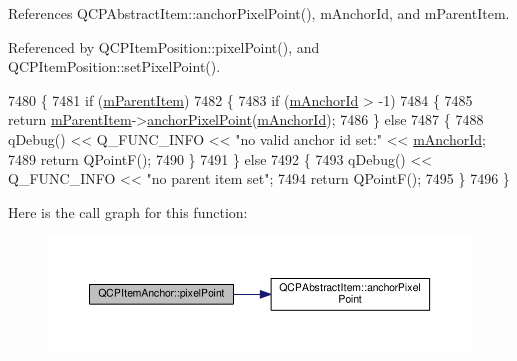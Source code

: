References Q\+C\+P\+Abstract\+Item\+::anchor\+Pixel\+Point(), m\+Anchor\+Id, and m\+Parent\+Item.



Referenced by Q\+C\+P\+Item\+Position\+::pixel\+Point(), and Q\+C\+P\+Item\+Position\+::set\+Pixel\+Point().


\begin{DoxyCode}
7480 \{
7481   \textcolor{keywordflow}{if} (\hyperlink{class_q_c_p_item_anchor_a80fad480ad3bb980446ed6ebc00818ae}{mParentItem})
7482   \{
7483     \textcolor{keywordflow}{if} (\hyperlink{class_q_c_p_item_anchor_a00c62070333e8345976b579676ad3997}{mAnchorId} > -1)
7484     \{
7485       \textcolor{keywordflow}{return} \hyperlink{class_q_c_p_item_anchor_a80fad480ad3bb980446ed6ebc00818ae}{mParentItem}->\hyperlink{class_q_c_p_abstract_item_a94bde62b8a2fc133666dcbb8035deeed}{anchorPixelPoint}(\hyperlink{class_q_c_p_item_anchor_a00c62070333e8345976b579676ad3997}{mAnchorId});
7486     \} \textcolor{keywordflow}{else}
7487     \{
7488       qDebug() << Q\_FUNC\_INFO << \textcolor{stringliteral}{"no valid anchor id set:"} << \hyperlink{class_q_c_p_item_anchor_a00c62070333e8345976b579676ad3997}{mAnchorId};
7489       \textcolor{keywordflow}{return} QPointF();
7490     \}
7491   \} \textcolor{keywordflow}{else}
7492   \{
7493     qDebug() << Q\_FUNC\_INFO << \textcolor{stringliteral}{"no parent item set"};
7494     \textcolor{keywordflow}{return} QPointF();
7495   \}
7496 \}
\end{DoxyCode}


Here is the call graph for this function\+:\nopagebreak
\begin{figure}[H]
\begin{center}
\leavevmode
\includegraphics[width=350pt]{class_q_c_p_item_anchor_ae92def8f9297c5d73f5806c586517bb3_cgraph}
\end{center}
\end{figure}




